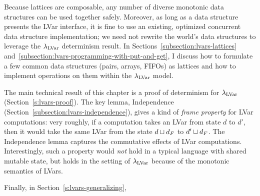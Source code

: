 Because lattices are composable, any number of diverse monotonic data
structures can be used together safely.  Moreover, as long as a data
structure presents the LVar interface, it is fine to use an existing,
optimized concurrent data structure implementation; we need not
rewrite the world's data structures to leverage the $\lambda_{\textrm{LVar}}$
determinism result. In Sections~\ref{subsection:lvars-lattices}
and~\ref{subsection:lvars-programming-with-put-and-get}, I discuss how
to formulate a few common data structures (pairs, arrays, FIFOs) as
lattices and how to implement operations on them within the
$\lambda_{\textrm{LVar}}$ model.

The main technical result of this chapter is a proof of determinism
for $\lambda_{\textrm{LVar}}$ (Section~\ref{s:lvars-proof}).  The key lemma,
Independence (Section~\ref{subsection:lvars-independence}), gives a
kind of \emph{frame property} for LVar computations: very roughly, if
a computation takes an LVar from state $d$ to $d'$, then it would take
the same LVar from the state $d \sqcup d_F$ to
$d' \sqcup d_F$.  The Independence lemma captures the commutative
effects of LVar computations.  Interestingly, such a property
would \emph{not} hold in a typical language with shared mutable state,
but holds in the setting of $\lambda_{\textrm{LVar}}$ because of the monotonic
semantics of LVars.

Finally, in Section~\ref{s:lvars-generalizing}, 
